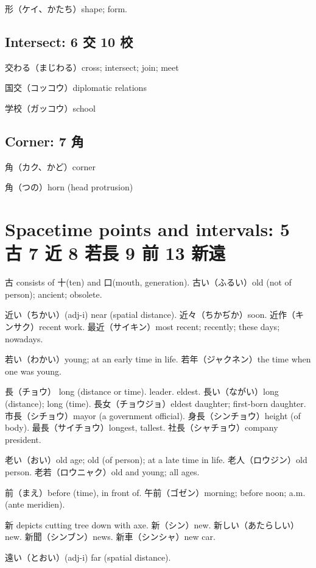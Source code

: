 形（ケイ、かたち）shape; form.

\subsection{Intersect: 6 交 10 校}

交わる（まじわる）cross; intersect; join; meet

国交（コッコウ）diplomatic relations

学校（ガッコウ）school

\subsection{Corner: 7 角}

角（カク、かど）corner

角（つの）horn (head protrusion)

\section{Spacetime points and intervals: 5 古 7 近 8 若長 9 前 13 新遠}

古 consists of 十(ten) and 口(mouth, generation).
古い（ふるい）old (not of person); ancient; obsolete.

近い（ちかい）(adj-i) near (spatial distance).
近々（ちかぢか）soon.
近作（キンサク）recent work.
最近（サイキン）most recent; recently; these days; nowadays.

若い（わかい）young; at an early time in life.
若年（ジャクネン）the time when one was young.

長（チョウ）
long (distance or time).
leader.
eldest.
長い（ながい）long (distance); long (time).
長女（チョウジョ）eldest daughter; first-born daughter.
市長（シチョウ）mayor (a government official).
身長（シンチョウ）height (of body).
最長（サイチョウ）longest, tallest.
社長（シャチョウ）company president.

老い（おい）old age; old (of person); at a late time in life.
老人（ロウジン）old person.
老若（ロウニャク）old and young; all ages.

前（まえ）before (time), in front of.
午前（ゴゼン）morning; before noon; a.m. (ante meridien).

新 depicts cutting tree down with axe.
新（シン）new.
新しい（あたらしい）new.
新聞（シンブン）news.
新車（シンシャ）new car.

遠い（とおい）(adj-i) far (spatial distance).
